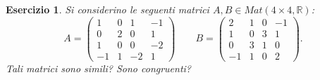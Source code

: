 \documentclass{article}
\newtheorem{es}{Esercizio}
\begin{document}
{\begin{es}
    Si considerino le seguenti matrici $A,B\in Mat(4 \times 4, \mathbb{R})$:
    $$
    A=\begin{pmatrix}
        1 & 0 & 1 & -1 \\
        0 & 2 & 0 & 1 \\
        1 & 0 & 0 & -2 \\
        -1 & 1 & -2 & 1
    \end{pmatrix} \qquad
    B=\begin{pmatrix}
        2 & 1 & 0 & -1 \\
        1 & 0 & 3 & 1 \\
        0 & 3 & 1 & 0 \\
        -1 & 1 & 0 & 2
    \end{pmatrix}.
    $$
    Tali matrici sono simili? Sono congruenti?
\end{es}




}
\end{document}
